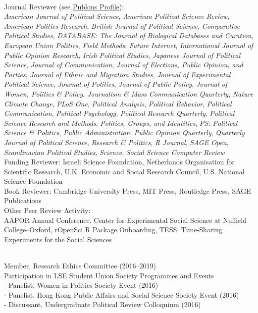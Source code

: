 \documentclass[12pt]{article}
\renewcommand{\section}[1]{\pagebreak[3]%
    \llap{\scshape\smash{\parbox[t]{\marginparwidth}{\raggedright {\color{lg}#1}}}}%
    \vspace{-\baselineskip}\par}
\newcommand{\topic}[1]{\pagebreak[3]\indent {\color{lg}{\footnotesize #1 }}\\}
\newcommand{\entry}[1]{\indent {\color{lg}\guillemotright}\hspace{2pt}#1\vspace{.25em}\\}
\newcommand{\subentry}[1]{{\color{lg}-} #1\vspace{.25em}\\}
\begin{document}
\topic{Peer Review Activity}
	\entry{Journal Reviewer (see \href{https://publons.com/a/634082/}{Publons Profile}):\\\textit{American Journal of Political Science}, \textit{American Political Science Review}, \textit{American Politics Research}, \textit{British Journal of Political Science}, \textit{Comparative Political Studies}, \textit{DATABASE: The Journal of Biological Databases and Curation}, \textit{European Union Politics}, \textit{Field Methods}, \textit{Future Internet}, \textit{International Journal of Public Opinion Research}, \textit{Irish Political Studies}, \textit{Japanese Journal of Political Science}, \textit{Journal of Communication}, \textit{Journal of Elections, Public Opinion, and Parties}, \textit{Journal of Ethnic and Migration Studies}, \textit{Journal of Experimental Political Science}, \textit{Journal of Politics}, \textit{Journal of Public Policy}, \textit{Journal of Women, Politics \& Policy}, \textit{Journalism \& Mass Communication Quarterly}, \textit{Nature Climate Change}, \textit{PLoS One}, \textit{Political Analysis}, \textit{Political Behavior}, \textit{Political Communication}, \textit{Political Psychology}, \textit{Political Research Quarterly}, \textit{Political Science Research and Methods}, \textit{Politics, Groups, and Identities}, \textit{PS: Political Science \& Politics}, \textit{Public Administration}, \textit{Public Opinion Quarterly}, \textit{Quarterly Journal of Political Science}, \textit{Research \& Politics}, \textit{R Journal}, \textit{SAGE Open}, \textit{Scandinavian Political Studies}, \textit{Science}, \textit{Social Science Computer Review}}
	\entry{Funding Reviewer: Israeli Science Foundation, Netherlands Organisation for Scientific Research, U.K. Economic and Social Research Council, U.S. National Science Foundation}
	\entry{Book Reviewer: Cambridge University Press, MIT Press, Routledge Press, SAGE Publications}
	\entry{Other Peer Review Activity:\\ AAPOR Annual Conference, Center for Experimental Social Science at Nuffield College--Oxford, rOpenSci R Package Onboarding, TESS: Time-Sharing Experiments for the Social Sciences}

\section{Institutional\\ \& Professional Service}
\topic{Institutional (London School of Economics and Political Science)}
	\entry{Member, Research Ethics Committee (2016--2019)}
	\entry{Participation in LSE Student Union Society Programmes and Events}
        \subentry{Panelist, Women in Politics Society Event (2016)}
        \subentry{Panelist, Hong Kong Public Affairs and Social Science Society Event (2016)}
        \subentry{Discussant, Undergraduate Political Review Colloquium (2016)}
	
\end{document}
